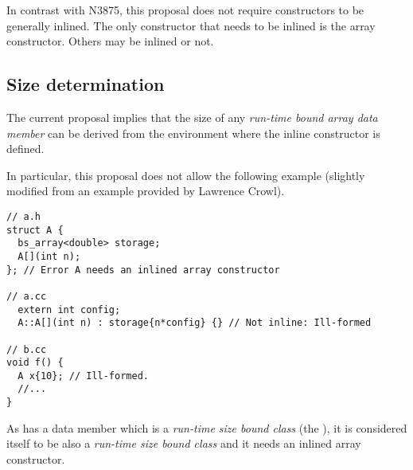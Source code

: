 In contrast with N3875, this proposal does not require constructors to be
generally inlined. The only constructor that needs to be inlined is the
array constructor. Others may be inlined or not.

\subsection{Size determination}
\label{sec:inline-size-det}

The current proposal implies that the size of any \emph{run-time bound array
data member} can be derived from the environment where the inline constructor is
defined.

In particular, this proposal does not allow the following example (slightly
modified from an example provided by Lawrence Crowl).

\begin{lstlisting}
// a.h
struct A {
  bs_array<double> storage;
  A[](int n);
}; // Error A needs an inlined array constructor

// a.cc
  extern int config;
  A::A[](int n) : storage{n*config} {} // Not inline: Ill-formed

// b.cc
void f() {
  A x{10}; // Ill-formed.
  //...
}
\end{lstlisting}

As   has a data member which is a \emph{run-time size bound class}
(the ), it is considered itself to be also a \emph{run-time size
bound class} and it needs an inlined array constructor.

